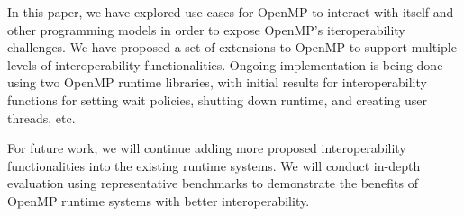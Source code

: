 In this paper, we have explored use cases for OpenMP to interact with itself and other programming models
in order to expose OpenMP's iteroperability challenges. 
We have proposed a set of extensions to OpenMP to support multiple levels of interoperability functionalities. 
Ongoing implementation is being done using two OpenMP runtime libraries, with initial results for 
interoperability functions for setting wait policies, shutting down runtime, and creating user threads, etc. 
\begin{comment}
One feature is 
that allowing the user to create a new OpenMP thread and assign a task to it instead 
of creating new user thread. We have implement a function to allow users to get one 
thread from the existing thread pool is any threads are available, and assign one task 
to this thread, this helps to take advantage of the OpenMP thread pool and won’t need 
to create a new thread to work on it, which helps to save the memory usage and speed up the runtime.

We have studied the waiting policy of the OpenMP and how the current OpenMP Runtime System deals with the thread pool. Considering there are two waiting policies, one called throughput (passive), which is designed to make the program aware of its environment (that is, the system load) and to adjust its resource usage to produce efficient execution in a dynamic environment. While the other one called turnaround (active), which is designed to keep active all of the processors involved in the parallel computation in order to minimize the execution time of a single job. We cannot simply say which one is better than the other, it depends one the executing environment. When setting the wait policy to be passive, after a certain period of time has elapsed, the useless thread will stop waiting and sleep. Thus active mode may be better for high-density of OpenMP tasks. While, a passive mode with a small blocktime value may offer better overall performance if your application contains non-OpenMP threaded code that executes between parallel regions. 

In addition, we have implemented a new function to shutdown the whole runtime library when exiting the parallel region. Since all threads are maintained in the same thread pool, quiesce will reap every threads to free the memory, which sometimes help to clear the runtime environment when the task density is lower and we don’t need to wake up most of the thread in the thread pool. However, when entering new parallel regions, we need to make sure that we register the current working thread as our root thread, so that new runtime environment can be built on it. It cost time to restart another parallel region, thus works slower when lots of tasks in the task queue.
\end{comment}

For future work, we will continue adding more proposed interoperability functionalities into the existing runtime systems. We will conduct in-depth evaluation using representative benchmarks to demonstrate the benefits of OpenMP runtime systems with better interoperability. 
